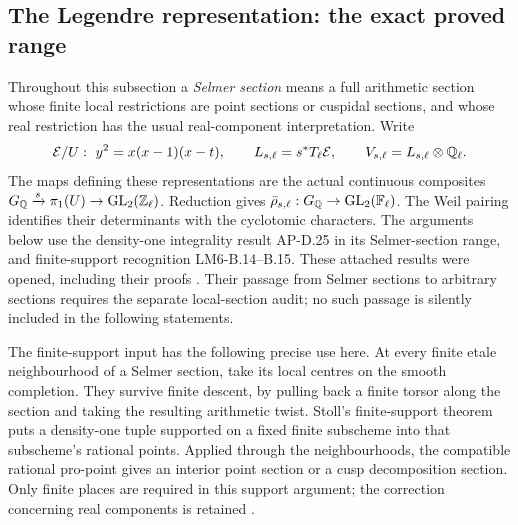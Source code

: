 \subsection{The Legendre representation: the exact proved range}

Throughout this subsection a \emph{Selmer section} means a full arithmetic
section whose finite local restrictions are point sections or cuspidal
sections, and whose real restriction has the usual real-component
interpretation.  Write
\[
 \mathcal E/U:\ y^2=x(x-1)(x-t),\qquad
 L_{s,\ell}=s^*T_\ell\mathcal E,\qquad
 V_{s,\ell}=L_{s,\ell}\otimes\mathbb Q_\ell.
\]
The maps defining these representations are the actual continuous
composites $G_\mathbb Q\xrightarrow{s}\pi_1(U)\to
\operatorname{GL}_2(\mathbb Z_\ell)$.  Reduction gives
$\bar\rho_{s,\ell}:G_\mathbb Q\to\operatorname{GL}_2(\mathbb F_\ell)$.
The Weil pairing identifies their determinants with the cyclotomic
characters.  The arguments below use the density-one integrality result
AP-D.25 in its Selmer-section range, and finite-support recognition
LM6-B.14--B.15.  These attached results were opened, including their proofs
\cite{LegAP2026,LegLM62026}.  Their passage from Selmer sections to arbitrary
sections requires the separate local-section audit; no such passage is
silently included in the following statements.

The finite-support input has the following precise use here.  At every
finite etale neighbourhood of a Selmer section, take its local centres on
the smooth completion.  They survive finite descent, by pulling back a
finite torsor along the section and taking the resulting arithmetic twist.
Stoll's finite-support theorem puts a density-one tuple supported on a
fixed finite subscheme into that subscheme's rational points.  Applied
through the neighbourhoods, the compatible rational pro-point gives an
interior point section or a cusp decomposition section.  Only finite
places are required in this support argument; the correction concerning
real components is retained \cite[Theorem 8.2 and Proposition 8.5]{LegStoll2007}
\cite[\S3]{LegStollErrata2017}.

